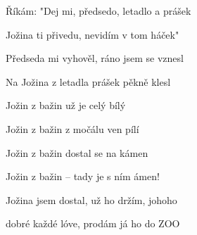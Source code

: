 \begin{song}
\bigskip

\Refren

\bigskip

 \par
{}Říkám: "Dej mi, předsedo, letadlo a prášek \par
{}Jožina ti přivedu, nevidím v tom háček" \par
{}Předseda mi vyhověl, ráno jsem se vznesl \par
{}Na Jožina z letadla prášek pěkně klesl \par

\bigskip

Jožin z bažin už je celý bílý \par
{}Jožin z bažin z močálu ven pílí \par
{}Jožin z bažin dostal se na kámen \par
{}Jožin z bažin – tady je s ním ámen! \par
{}Jožina jsem dostal, už ho držím, johoho  \par
{}dobré každé lóve, prodám já ho do ZOO \par

\bigskip

     \par
{}    \par

\end{song}
